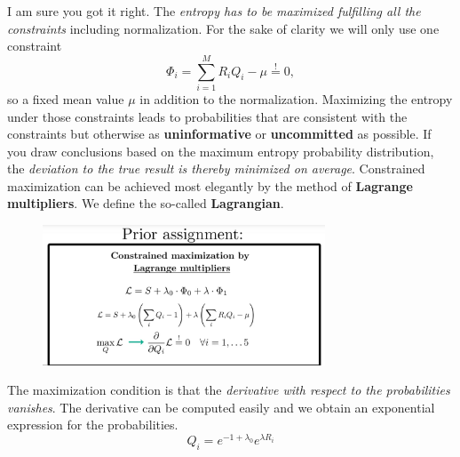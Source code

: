 \documentclass[12pt, a4paper]{scrartcl}
\begin{document}
I am sure you got it right. The \textit{entropy has to be maximized fulfilling
all the constraints} including normalization. For the sake of clarity we
will only use one constraint \[\Phi_i=\sum_{i=1}^MR_iQ_i-\mu\stackrel{!}{=}0,\] so a fixed mean value $\mu$ in addition to the normalization. 
Maximizing the entropy under those constraints leads to probabilities
that are consistent with the constraints but otherwise as \textbf{uninformative} or
\textbf{uncommitted} as possible. If you draw conclusions based on the maximum
entropy probability distribution, the \textit{deviation to the true result is thereby
minimized on average}.
Constrained maximization can be achieved most elegantly by the method of
\textbf{Lagrange multipliers}. We define the so-called \textbf{Lagrangian}.\\%
 \begin{figure}[H]
	\centering
	\includegraphics[width=0.75\textwidth]{6_6.png}
\end{figure}

The maximization condition is that the \textit{derivative with respect to the probabilities vanishes}.
The derivative can be computed easily and we obtain an exponential expression for the probabilities.\\

\begin{equation*}\boxed{Q_i=e^{-1+\lambda_0}e^{\lambda R_i}
}\end{equation*}\\
\end{document}
